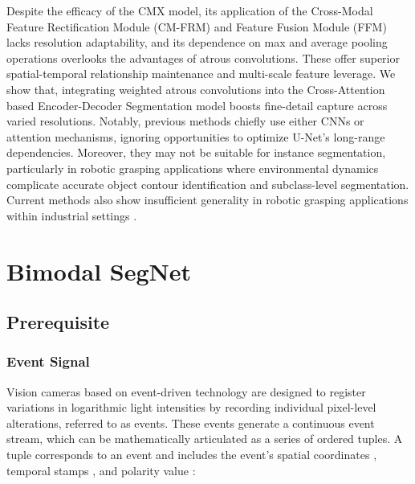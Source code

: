 \documentclass[lettersize,journal]{IEEEtran}
\begin{document}
Despite the efficacy of the CMX model, its application of the Cross-Modal Feature Rectification Module (CM-FRM) and Feature Fusion Module (FFM) lacks resolution adaptability, and its dependence on max and average pooling operations overlooks the advantages of atrous convolutions. These offer superior spatial-temporal relationship maintenance and multi-scale feature leverage. We show that, integrating weighted atrous convolutions into the Cross-Attention based Encoder-Decoder Segmentation model boosts fine-detail capture across varied resolutions. Notably, previous methods chiefly use either CNNs or attention mechanisms, ignoring opportunities to optimize U-Net's long-range dependencies. Moreover, they may not be suitable for instance segmentation, particularly in robotic grasping applications where environmental dynamics complicate accurate object contour identification and subclass-level segmentation. Current methods also show insufficient generality in robotic grasping applications within industrial settings \cite{Hua2023DynamicTransmission, Karthik2022Contour-enhancedSegmentation, Wang2021EFNet:Segmentation}.











\section{{Bimodal SegNet}}
\label{section : Methodology}

\subsection{Prerequisite}
\subsubsection{\textbf{Event Signal}}
Vision cameras based on event-driven technology are designed to register variations in logarithmic light intensities by recording individual pixel-level alterations, referred to as events. These events generate a continuous event stream, which can be mathematically articulated as a series of ordered tuples. A tuple corresponds to an event  and includes the event's spatial coordinates , temporal stamps , and polarity value  \cite{BaghaeiNaeini2020AApplications}: 
    


 
\end{document}
